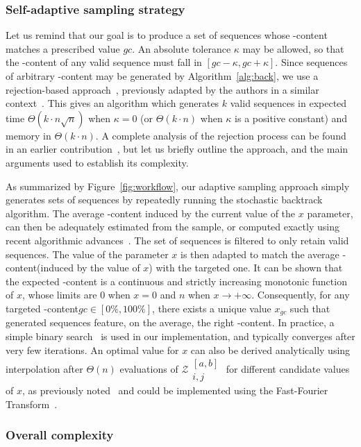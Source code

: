 \documentclass{bioinfo}
\newcommand{\GCContent}{\Gb\Cb-content\xspace}
\newcommand{\Z}[2]{\mathcal{Z}{\substack{[#2]\\#1}}}
\newcommand{\Cb}{{\sf{C}}\xspace}
\newcommand{\Gb}{{\sf{G}}\xspace}
\begin{document}
\subsubsection{Self-adaptive sampling strategy}

Let us remind that our goal is to produce a set of sequences whose \GCContent matches a prescribed value $gc$.
An absolute tolerance $\kappa$ may be allowed, so that the \GCContent of any valid sequence must fall in  
$[gc-\kappa,gc+\kappa]$. Since sequences of arbitrary \GCContent may be generated by Algorithm~\ref{alg:back}, we use a rejection-based approach~\citep{Bodini2010}, previously adapted by the authors in a similar context~\citep{Waldispuhl2011}. This gives an algorithm which generates $k$ valid sequences in expected time $\Theta(k\cdot n\sqrt{n})$ when $\kappa=0$ (or $\Theta(k\cdot n)$ when $\kappa$ is a positive constant) and memory in $\Theta(k\cdot n)$.
A complete analysis of the rejection process can be found in an earlier contribution~\citep{Waldispuhl2011}, but let us briefly outline the approach, and the main arguments used to establish its complexity.


As summarized by Figure~\ref{fig:workflow}, our adaptive sampling approach simply generates sets of sequences by repeatedly running the stochastic backtrack algorithm. The average \GCContent induced by the current value of the $x$ parameter, can then be adequately estimated from the sample, or computed exactly using recent algorithmic advances~\citep{Ponty2011}. The set of sequences is filtered to only retain valid sequences. The value of the parameter $x$ is then adapted to match the average \GCContent (induced by the value of $x$) with the targeted one.
It can be shown that the expected \GCContent is a continuous and strictly increasing monotonic function of $x$, whose limits are $0$ when $x=0$ and $n$ when $x\to +\infty$. Consequently, for any targeted \GCContent $gc\in[0\%,100\%]$, there exists a unique value $x_{gc}$ such that generated sequences feature, on the average, the right \GCContent.
In practice, a simple binary search~\citep{Waldispuhl2011} is used in our implementation, and typically converges after very few iterations. An optimal value for $x$ can also be derived analytically using interpolation after $\Theta(n)$ evaluations of $\Z{i,j}{a,b}$ for different candidate values of $x$, as previously noted~\citep{Waldispuhl2011} and could be implemented using the Fast-Fourier Transform~\citep{Senter2012}.

\subsubsection{Overall complexity}
\end{document}
